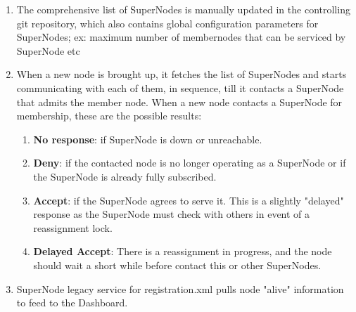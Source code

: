 \documentclass[oneside,12pt]{memoir}
\begin{document}
\begin{enumerate}
\item The comprehensive list of SuperNodes is manually updated in the controlling git repository, which also contains global configuration parameters for SuperNodes; ex: maximum number of membernodes that can be serviced by SuperNode etc
\item When a new node is brought up, it fetches the list of SuperNodes and starts communicating with each of them, in sequence, till it contacts a SuperNode that admits the member node. When a new node contacts a SuperNode for membership, these are the possible results:
\begin{enumerate}
\item \textbf{No response}: if SuperNode is down or unreachable.
\item \textbf{Deny}: if the contacted node is no longer operating as a SuperNode or if the SuperNode is already fully subscribed.
\item \textbf{Accept}: if the SuperNode agrees to serve it.  This is a slightly "delayed" response as the SuperNode must check with others in event of a reassignment lock. 
\item \textbf{Delayed Accept}:  There is a reassignment in progress, and the node should wait a short while before contact this or other SuperNodes. 
\end{enumerate}





\item SuperNode legacy service for registration.xml pulls node "alive" information to feed to the Dashboard.  

\end{enumerate}
\end{document}
